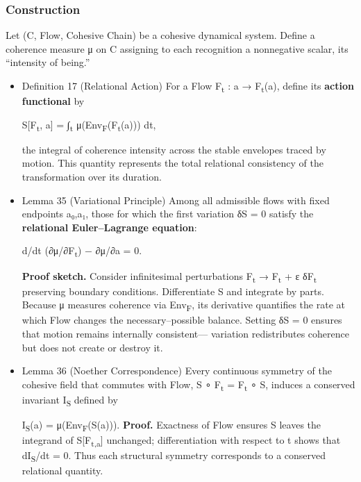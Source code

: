 \documentclass[11pt]{article}
\begin{document}
\subsubsection*{Construction}
\label{sec:orgb4b37a3}
Let (C, Flow, Cohesive Chain) be a cohesive dynamical system.  
Define a coherence measure μ on C assigning to each recognition a nonnegative scalar, its “intensity of being.”  
\begin{itemize}
\item Definition 17 (Relational Action)
\label{sec:orgac05c1a}
For a Flow F\textsubscript{t} : a → F\textsubscript{t}(a), define its \textbf{action functional} by  

S[F\textsubscript{t}, a] = ∫\textsubscript{t} μ(Env\textsubscript{F}(F\textsubscript{t}(a))) dt,  

the integral of coherence intensity across the stable envelopes traced by motion.  
This quantity represents the total relational consistency of the transformation over its duration.
\item Lemma 35 (Variational Principle)
\label{sec:org5d442fd}
Among all admissible flows with fixed endpoints a₀,a₁,  
those for which the first variation δS = 0  
satisfy the \textbf{relational Euler–Lagrange equation}:

d/dt (∂μ/∂F\textsubscript{t}) − ∂μ/∂a = 0.  

\textbf{Proof sketch.}  
Consider infinitesimal perturbations F\textsubscript{t} → F\textsubscript{t} + ε δF\textsubscript{t} preserving boundary conditions.  
Differentiate S and integrate by parts.  
Because μ measures coherence via Env\textsubscript{F},  
its derivative quantifies the rate at which Flow changes the necessary–possible balance.  
Setting δS = 0 ensures that motion remains internally consistent—  
variation redistributes coherence but does not create or destroy it.
\item Lemma 36 (Noether Correspondence)
\label{sec:orgd44c5b6}
Every continuous symmetry of the cohesive field that commutes with Flow,  
S ∘ F\textsubscript{t} = F\textsubscript{t} ∘ S,  
induces a conserved invariant I\textsubscript{S} defined by  

I\textsubscript{S}(a) = μ(Env\textsubscript{F}(S(a))).  
\textbf{Proof.}  
Exactness of Flow ensures S leaves the integrand of S[F\textsubscript{t,a}] unchanged;  
differentiation with respect to t shows that dI\textsubscript{S}/dt = 0.  
Thus each structural symmetry corresponds to a conserved relational quantity.
\end{itemize}
\end{document}
